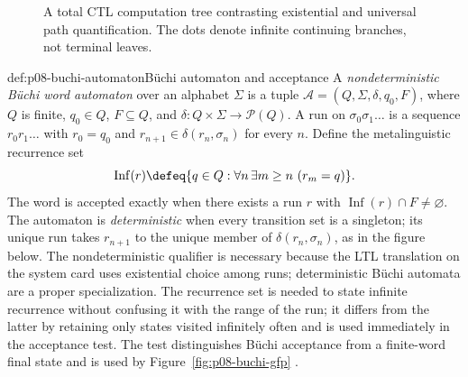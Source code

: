 \begin{figure}[!htbp]
\centering
{}
\caption{A total CTL computation tree contrasting existential and universal
path quantification.  The dots denote infinite continuing
branches, not terminal leaves.}
\label{fig:p08-ctl-tree}
\end{figure}

\begin{hbdefinition}{def:p08-buchi-automaton}{B\"uchi automaton and acceptance}
A \emph{nondeterministic B\"uchi word automaton} over an alphabet \(\Sigma\)
is a tuple
\(\mathcal A=(Q,\Sigma,\delta,q_0,F)\), where \(Q\) is finite,
\(q_0\in Q\), \(F\subseteq Q\), and
\(\delta:Q\times\Sigma\to\mathcal P(Q)\).  A run on
\(\sigma_0\sigma_1\ldots\) is a sequence \(r_0r_1\ldots\) with
\(r_0=q_0\) and \(r_{n+1}\in\delta(r_n,\sigma_n)\) for every \(n\).
Define the metalinguistic recurrence set
\[
 \operatorname{Inf}(r)\defeq
 \{q\in Q:\forall n\,\exists m\ge n\ (r_m=q)\}.
\]
The word is accepted exactly when there exists a run \(r\) with
\(\operatorname{Inf}(r)\cap F\ne\varnothing\).  The automaton is
\emph{deterministic} when every transition set is a singleton; its unique run
takes \(r_{n+1}\) to the unique member of
\(\delta(r_n,\sigma_n)\), as in the figure below.
The nondeterministic qualifier is necessary because the LTL translation on the
system card uses existential choice among runs; deterministic B\"uchi
automata are a proper specialization.  The recurrence set is needed to
state infinite recurrence without confusing it with the range of the run; it
differs from the latter by retaining only states visited infinitely often and
is used immediately in the acceptance test.  The test distinguishes B\"uchi
acceptance from a finite-word final state and is used by
Figure~\ref{fig:p08-buchi-gfp}
\cite{Buchi1962,VardiWolper1986}.
\end{hbdefinition}

